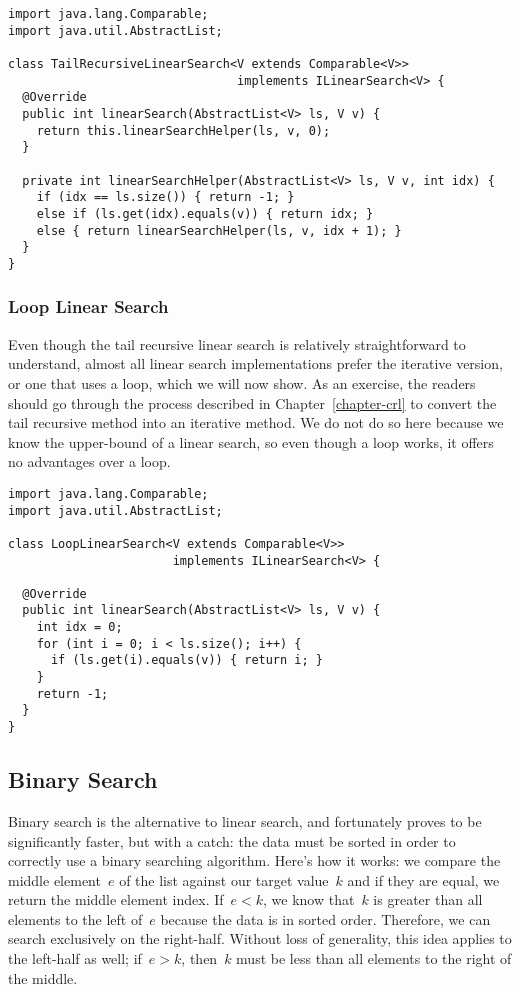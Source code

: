 \begin{lstlisting}[language=MyJava]
import java.lang.Comparable;
import java.util.AbstractList;

class TailRecursiveLinearSearch<V extends Comparable<V>> 
                                implements ILinearSearch<V> {
  @Override
  public int linearSearch(AbstractList<V> ls, V v) {
    return this.linearSearchHelper(ls, v, 0);
  }

  private int linearSearchHelper(AbstractList<V> ls, V v, int idx) {
    if (idx == ls.size()) { return -1; }
    else if (ls.get(idx).equals(v)) { return idx; }
    else { return linearSearchHelper(ls, v, idx + 1); }
  }
}
\end{lstlisting}

\subsubsection*{Loop Linear Search}

Even though the tail recursive linear search is relatively straightforward to understand, almost all linear search implementations prefer the iterative version, or one that uses a loop, which we will now show. 
As an exercise, the readers should go through the process described in Chapter~\ref{chapter-crl} to convert the tail recursive method into an iterative method. 
We do not do so here because we know the upper-bound of a linear search, so even though a  loop works, it offers no advantages over a  loop.

\begin{lstlisting}[language=MyJava]
import java.lang.Comparable;
import java.util.AbstractList;

class LoopLinearSearch<V extends Comparable<V>> 
                       implements ILinearSearch<V> {

  @Override
  public int linearSearch(AbstractList<V> ls, V v) {
    int idx = 0;
    for (int i = 0; i < ls.size(); i++) {
      if (ls.get(i).equals(v)) { return i; }
    }
    return -1;
  }
}
\end{lstlisting}

\subsection{Binary Search}

Binary search is the alternative to linear search, and fortunately proves to be significantly faster, but with a catch: the data must be sorted in order to correctly use a binary searching algorithm. 
Here's how it works: we compare the middle element~$e$ of the list against our target value~$k$ and if they are equal, we return the middle element index. 
If~$e < k$, we know that~$k$ is greater than all elements to the left of~$e$ because the data is in sorted order. 
Therefore, we can search exclusively on the right-half. 
Without loss of generality, this idea applies to the left-half as well; if~$e > k$, then~$k$ must be less than all elements to the right of the middle. 

